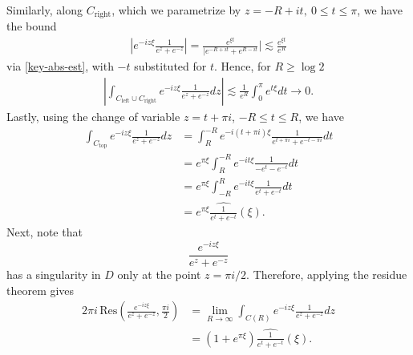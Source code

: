 \documentclass[12pt,reqno]{amsart}
\numberwithin{equation}{section}  %
\newcommand{\wh}{\widehat}
\begin{document}
        Similarly, along $C_{\text{right}}$, which we parametrize by $z = -R +
        it, \ 0 \le t \le \pi$, we have the bound
        \begin{equation*}
        \begin{split}
          | e^{-iz \xi} \frac{1}{e^{z} + e^{-z}} | = \frac{e^{\xi t}}{| e^{-R + it} +
          e^{R -it}}| \lesssim \frac{e^{\xi t}}{e^{R}}
        \end{split}
        \end{equation*}
        via \eqref{key-abs-est}, with $-t$ substituted for $t$. 
        Hence, for $R \ge \log 2$
        \begin{equation}
          \label{right-decay}
        \begin{split}
          | \int_{C_{\text{left}} \cup C_{\text{right}}}
          e^{-iz \xi} \frac{1}{e^{z} + e^{-z}} dz |
        \lesssim \frac{1}{e^{R}} \int_{0}^{\pi} e^{t \xi} dt \to 0.
     \end{split}
   \end{equation}
        Lastly, using the change of variable $z = t + \pi i$, $-R \le t \le R$,
        we have
        \begin{equation}
          \label{top-exp}
        \begin{split}
          \int_{C_{\text{top}}}e^{-iz \xi} \frac{1}{e^{z} + e^{-z}} dz
          & = \int_{R}^{-R} e^{-i(t + \pi i)\xi} 
          \frac{1}{e^{t + \pi i} + e^{-t - \pi i}} dt
          \\
          & = e^{ \pi \xi}  \int_{R}^{-R} e^{-it \xi} \frac{1}{-e^{t} -
          e^{-t}} dt
          \\
          & = e^{ \pi \xi}  \int_{-R}^{R} e^{-it \xi} \frac{1}{e^{t} +
          e^{-t}} dt
          \\
          & = e^{ \pi \xi} \wh{\frac{1}{e^{t} + e^{-t}}}(\xi).
        \end{split}
        \end{equation}
        Next, note that $$\frac{e^{-i z \xi}}{e^{z} +
        e^{-z}}$$ has a singularity in $D$ only at the
        point $z = \pi i/2$. Therefore, applying the residue theorem gives
        \begin{equation}
          \label{1h}
        \begin{split}
          2 \pi i \, \text{Res}
          \left( \frac{ e^{-iz \xi}}{e^{z} + e^{-z}}, \frac{\pi i}{2}
          \right)
          & = \lim_{R \to \infty} \int_{C(R)} e^{-i z \xi}
          \frac{1}{e^{z} + e^{-z}} dz 
          \\
          & = (1 + e^{ \pi \xi})
          \wh{\frac{1}{e^{t} + e^{-t}}}(\xi).
        \end{split}
        \end{equation}
\end{document}
